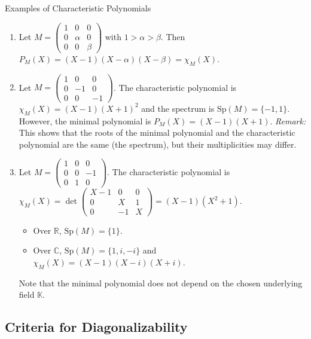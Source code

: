 \documentclass[11pt, a4paper]{article}
\begin{document}
\begin{example}{Examples of Characteristic Polynomials}{}
\begin{enumerate}
    \item Let $M = \begin{pmatrix} 1 & 0 & 0 \\ 0 & \alpha & 0 \\ 0 & 0 & \beta \end{pmatrix}$ with $1 > \alpha > \beta$.
    Then $P_M(X) = (X-1)(X-\alpha)(X-\beta) = \chi_M(X)$.
    
    \item Let $M = \begin{pmatrix} 1 & 0 & 0 \\ 0 & -1 & 0 \\ 0 & 0 & -1 \end{pmatrix}$.
    The characteristic polynomial is $\chi_M(X) = (X-1)(X+1)^2$ and the spectrum is $\text{Sp}(M) = \{-1, 1\}$.
    However, the minimal polynomial is $P_M(X) = (X-1)(X+1)$.
    \textit{Remark:} This shows that the roots of the minimal polynomial and the characteristic polynomial are the same (the spectrum), but their multiplicities may differ.

    \item Let $M = \begin{pmatrix} 1 & 0 & 0 \\ 0 & 0 & -1 \\ 0 & 1 & 0 \end{pmatrix}$.
    The characteristic polynomial is $\chi_M(X) = \det \begin{pmatrix} X-1 & 0 & 0 \\ 0 & X & 1 \\ 0 & -1 & X \end{pmatrix} = (X-1)(X^2+1)$.
    \begin{itemize}
        \item Over $\mathbb{R}$, $\text{Sp}(M) = \{1\}$.
        \item Over $\mathbb{C}$, $\text{Sp}(M) = \{1, i, -i\}$ and $\chi_M(X) = (X-1)(X-i)(X+i)$.
    \end{itemize}
    Note that the minimal polynomial does not depend on the chosen underlying field $\mathbb{K}$.
\end{enumerate}
\end{example}

\subsection{Criteria for Diagonalizability}
\end{document}
